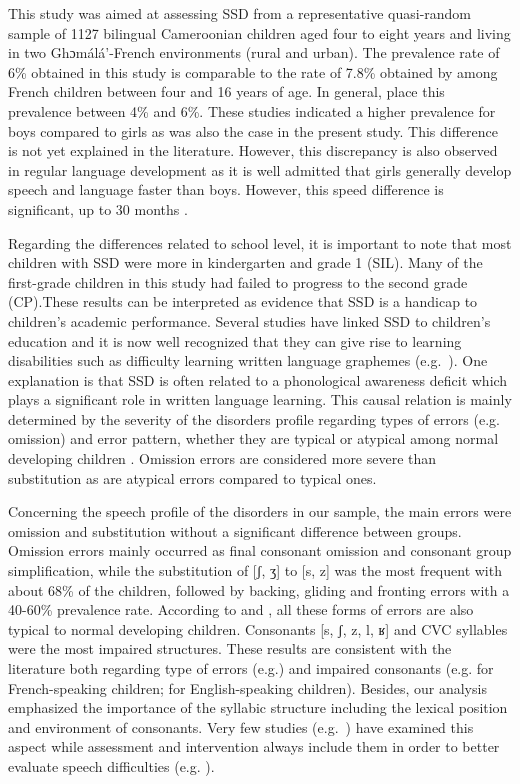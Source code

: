 \documentclass[output=paper,newtxmath,modfonts,nonflat,draftmode]{langsci/langscibook}
\begin{document}
This study was aimed at assessing SSD from a representative quasi-random sample of 1127 bilingual Cameroonian children aged four to eight years and living in two Ghɔmálá’-French environments (rural and urban). The prevalence rate of 6\% obtained in this study is comparable to the rate of 7.8\% obtained by \citet{Fombonne1997} among French children between four and 16 years of age. In general, \citet{Kirkpatrick1984} place this prevalence between 4\% and 6\%. These studies indicated a higher prevalence for boys compared to girls as was also the case in the present study. This difference is not yet explained in the literature. However, this discrepancy is also observed in regular language development as it is well admitted that girls generally develop speech and language faster than boys. However, this speed difference is significant, up to 30 months \citep{Eriksson2012}. 

Regarding the differences related to school level, it is important to note that most children with SSD were more in kindergarten and grade 1 (SIL). Many of the first-grade children in this study had failed to progress to the second grade (CP).These results can be interpreted as evidence that SSD is a handicap to children's academic performance. Several studies have linked SSD to children's education and it is now well recognized that they can give rise to learning disabilities such as difficulty learning written language graphemes (e.g.~\citealt{Rvachew2007}). One explanation is that SSD is often related to a phonological awareness deficit which plays a significant role in written language learning. This causal relation is mainly determined by the severity of the disorders profile regarding types of errors (e.g. omission) and error pattern, whether they are typical or atypical among normal developing children \cite{RvachewChiangEvans2007}. Omission errors are considered more severe than substitution as are atypical errors compared to typical ones.

Concerning the speech profile of the disorders in our sample, the main errors were omission and substitution without a significant difference between groups. Omission errors mainly occurred as final consonant omission and consonant group simplification, while the substitution of [ʃ, ʒ] to [s, z] was the most frequent with about 68\% of the children, followed by backing, gliding and fronting errors with a 40-60\% prevalence rate. According to \citet{RvachewChiangEvans2007} and \citet{Fox2001}, all these forms of errors are also typical to normal developing children. Consonants [s, ʃ, z, l, ʁ] and CVC syllables were the most impaired structures. These results are consistent with the literature both regarding type of errors (e.g.\citealt{Austin1997,Ruscello1991}) and impaired consonants (e.g. \citet{MaurinCherou1993} for French-speaking children; \citet{Shriberg1994} for English-speaking children). Besides, our analysis emphasized the importance of the syllabic structure including the lexical position and environment of consonants. Very few studies (e.g.~\citealt{RvachewChiangEvans2007}) have examined this aspect while assessment and intervention always include them in order to better evaluate speech difficulties (e.g. \citealt{MaurinCherou1993}). 
\end{document}
